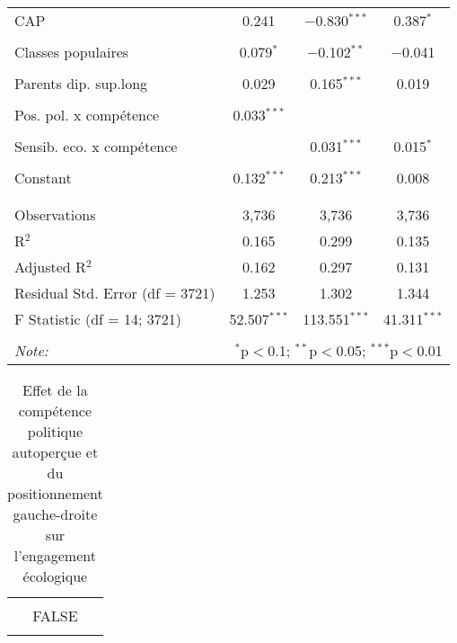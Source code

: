 \begin{table}[!htbp]
\begin{tabular}{@{\extracolsep{5pt}}lccc}
 CAP & 0.241 & $-$0.830$^{***}$ & 0.387$^{*}$ \\ 
  & & & \\ 
 Classes populaires & 0.079$^{*}$ & $-$0.102$^{**}$ & $-$0.041 \\ 
  & & & \\ 
 Parents dip. sup.long & 0.029 & 0.165$^{***}$ & 0.019 \\ 
  & & & \\ 
 Pos. pol. x compétence & 0.033$^{***}$ &  &  \\ 
  & & & \\ 
 Sensib. eco. x compétence &  & 0.031$^{***}$ & 0.015$^{*}$ \\ 
  & & & \\ 
 Constant & 0.132$^{***}$ & 0.213$^{***}$ & 0.008 \\ 
  & & & \\ 
\hline \\[-1.8ex] 
Observations & 3,736 & 3,736 & 3,736 \\ 
R$^{2}$ & 0.165 & 0.299 & 0.135 \\ 
Adjusted R$^{2}$ & 0.162 & 0.297 & 0.131 \\ 
Residual Std. Error (df = 3721) & 1.253 & 1.302 & 1.344 \\ 
F Statistic (df = 14; 3721) & 52.507$^{***}$ & 113.551$^{***}$ & 41.311$^{***}$ \\ 
\hline 
\hline \\[-1.8ex] 
\textit{Note:}  & \multicolumn{3}{r}{$^{*}$p$<$0.1; $^{**}$p$<$0.05; $^{***}$p$<$0.01} \\ 
\end{tabular} 
\end{table} 

\begin{table}[!htbp] \centering 
  \caption{Effet de la compétence politique autoperçue et du positionnement gauche-droite sur l'engagement écologique} 
  \label{} 
\begin{tabular}{@{\extracolsep{5pt}} c} 
\\[-1.8ex]\hline 
\hline \\[-1.8ex] 
FALSE \\ 
\hline \\[-1.8ex] 
\end{tabular} 
\end{table} 
